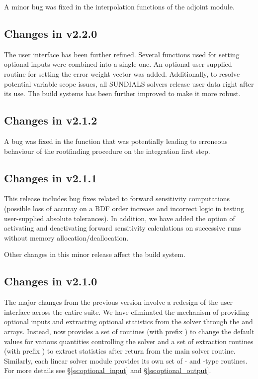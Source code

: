 A minor bug was fixed in the interpolation functions of the adjoint
{\cvodes} module.

\subsection*{Changes in v2.2.0}

The user interface has been further refined. Several functions used
for setting optional inputs were combined into a single one.  An optional
user-supplied routine for setting the error weight vector was added.
Additionally, to resolve potential variable scope issues, all
SUNDIALS solvers release user data right after its use. The build
systems has been further improved to make it more robust.

\subsection*{Changes in v2.1.2}

A bug was fixed in the  function that was potentially
leading to erroneous behaviour of the rootfinding procedure on the
integration first step.

\subsection*{Changes in v2.1.1}

This {\cvodes} release includes bug fixes related to forward sensitivity
computations (possible loss of accuray on a BDF order increase and incorrect
logic in testing user-supplied absolute tolerances).
In addition, we have added the option of activating and deactivating
forward sensitivity calculations on successive {\cvodes} runs without memory
allocation/deallocation.

Other changes in this minor {\sundials} release affect the build system.

\subsection*{Changes in v2.1.0}

The major changes from the previous version involve a redesign of the
user interface across the entire {\sundials} suite. We have eliminated the
mechanism of providing optional inputs and extracting optional statistics
from the solver through the  and  arrays. Instead,
{\cvodes} now provides a set of routines (with prefix )
to change the default values for various quantities controlling the
solver and a set of extraction routines (with prefix )
to extract statistics after return from the main solver routine.
Similarly, each linear solver module provides its own set of {-}
and {-type} routines. For more details see \S\ref{ss:optional_input}
and \S\ref{ss:optional_output}.

